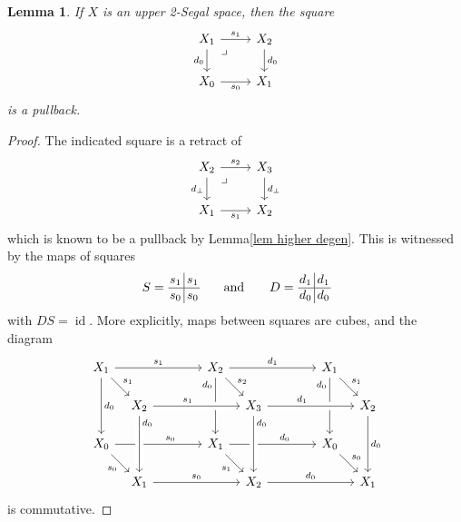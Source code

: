 \documentclass{amsart}
\newtheorem{lemma}[theorem]{Lemma}
\theoremstyle{definition}
\theoremstyle{remark}
\DeclareMathOperator{\id}{id}
\begin{document}
\begin{lemma}\label{lem bot degen}
If $X$ is an upper 2-Segal space, then the square
\[ \begin{tikzcd}
X_1 \rar{s_1} \dar[swap]{d_0} \ar[dr, phantom, "\lrcorner" very near start]  & X_2 \dar{d_0} \\
X_0  \rar[swap]{s_0} & X_1
\end{tikzcd} 
\]
is a pullback.
\end{lemma}
\begin{proof}
The indicated square is a retract of 
\[
\begin{tikzcd}
X_2 \rar{s_2} \dar[swap]{d_\bot} \ar[dr, phantom, "\lrcorner" very near start]  & X_3 \dar{d_\bot} \\
X_1  \rar[swap]{s_1} & X_2
\end{tikzcd} 
\]
which is known to be a pullback by Lemma\nobreakspace \ref {lem higher degen}.
This is witnessed by the maps of squares
\[
\setlength\arraycolsep{1pt}
S = \,
\begin{matrix}
s_1 & \vline & s_1 \\
\hline
s_0 & \vline & s_0
\end{matrix}
\qquad
\text{and}
\qquad
D = 
\, \begin{matrix}
d_1 & \vline & d_1 \\
\hline
d_0 & \vline & d_0
\end{matrix}
\]
with $DS = \id$.
More explicitly, maps between squares are cubes, and the diagram
  \[
  \begin{tikzcd}[sep={30pt,between origins}]
      {X_1} \ar[rrr, "s_1"] \ar[dd, "d_0"] \ar[dr, "s_1"] & & & 
      {X_2} \ar[rrr, "d_1"] \ar[dd, "d_0"' very near start] \ar[dr, "s_2"] & & & 
      {X_1} \ar[dd, "d_0"' very near start] \ar[dr, "s_1"] & \\ &
      {X_2} \ar[rrr, pos=0.4, "s_1", crossing over]   & & & 
      {X_3} \ar[rrr, pos=0.4, "d_1", crossing over]   & & & 
      {X_2} \ar[dd,"d_0"] \\ 
      {X_0} \ar[rrr, pos=0.64, "s_0"] \ar[dr, "s_0"'] & & & 
      {X_1} \ar[rrr, pos=0.64, "d_0"] \ar[dr, "s_1"'] & & & 
      {X_0} \ar[dr, "s_0"] & \\ &
      {X_1} \ar[rrr, "s_0"] \ar[from=uu, crossing over, "d_0" very near start] & & &  
      {X_2} \ar[rrr, "d_0"] \ar[from=uu, crossing over, "d_0" very near start] & & &  
      {X_1}
  \end{tikzcd}
  \]
is commutative.
\end{proof}
\end{document}
